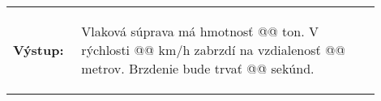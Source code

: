 \vspace{-2em}
\begin{tabular}{@{}p{0.15\linewidth}p{0.75\linewidth}}
\textbf{\small Výstup:} &
\vspace{-3em}
\begin{code}
Vlaková súprava má hmotnosť @\fbox{\phantom{vstup}}@ ton.
V rýchlosti @\fbox{\phantom{vstup}}@ km/h zabrzdí na vzdialenosť @\fbox{\phantom{vstup}}@ metrov.
Brzdenie bude trvať @\fbox{\phantom{vstup}}@ sekúnd.
\end{code}
\end{tabular}
\vspace{-2em}
